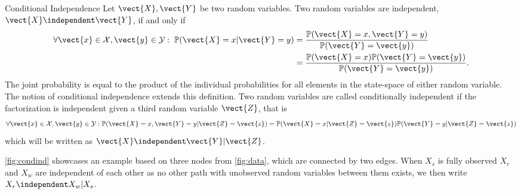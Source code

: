 \begin{definition}{Conditional Independence}
    Let $\vect{X}, \vect{Y}$ be two random variables. Two random variables are independent,  $\vect{X} \independent \vect{Y}$, if and only if
    \begin{equation}
        \begin{split}
        \forall \vect{x} \in \mathcal{X}, \vect{y} \in \mathcal{Y}:  \; \mathbb{P}(\vect{X} = x \lvert \vect{Y} = y) &= \frac{\mathbb{P}(\vect{X} = x , \vect{Y} = y)}{\mathbb{P}(\vect{Y} = \vect{y})} \\
        &=  \frac{\mathbb{P}(\vect{X} = x) \mathbb{P}(\vect{Y} = \vect{y})}{\mathbb{P}(\vect{Y} = \vect{y})}.  \\
        \end{split}
    \end{equation} 
    The joint probability is equal to the product of the individual probabilities for all elements in the state-space of either random variable.
    The notion of conditional independence extends this definition. 
    Two random variables are called conditionally independent if the factorization is independent given a third random variable $\vect{Z}$, that is
    \begin{equation}
        \forall \vect{x} \in \mathcal{X}, \vect{y} \in \mathcal{Y}: \mathbb{P}(\vect{X} = x , \vect{Y} = y \lvert \vect{Z} = \vect{z}) =   \mathbb{P}(\vect{X} = x \lvert \vect{Z} = \vect{z}) \mathbb{P}(\vect{Y} = y \lvert \vect{Z} = \vect{z})
    \end{equation}
    which will be written as $\vect{X} \independent \vect{Y} \lvert \vect{Z}$.

    \autoref{fig:condind} showcases an example based on three nodes from \autoref{fig:data}, which are connected by two edges. 
    When $X_s$ is fully observed $X_r$ and $X_w$ are independent of each other as no other path with unobserved random variables between them exists, we then write $X_r \independent X_w \lvert X_s$.   
            

\end{definition}




